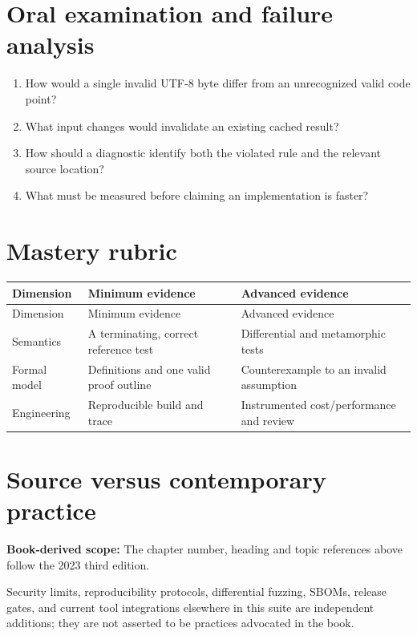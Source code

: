 \documentclass[10pt,letterpaper]{article}
\begin{document}
\section{Oral examination and failure analysis}
\begin{enumerate}
\item How would a single invalid UTF-8 byte differ from an unrecognized valid code point?
\item What input changes would invalidate an existing cached result?
\item How should a diagnostic identify both the violated rule and the relevant source location?
\item What must be measured before claiming an implementation is faster?
\end{enumerate}

\section{Mastery rubric}
\begin{longtable}{|>{\raggedright\arraybackslash}p{}|>{\raggedright\arraybackslash}p{}|>{\raggedright\arraybackslash}p{}|}
\hline
Dimension & Minimum evidence & Advanced evidence\\ \hline\endfirsthead
\hline
Dimension & Minimum evidence & Advanced evidence\\ \hline\endhead
Semantics & A terminating, correct reference test & Differential and metamorphic tests\\ \hline
Formal model & Definitions and one valid proof outline & Counterexample to an invalid assumption\\ \hline
Engineering & Reproducible build and trace & Instrumented cost/performance and review\\ \hline
\end{longtable}

\section{Source versus contemporary practice}
\textbf{Book-derived scope:} The chapter number, heading and topic references above follow the 2023 third edition.\par\modern Security limits, reproducibility protocols, differential fuzzing, SBOMs, release gates, and current tool integrations elsewhere in this suite are independent additions; they are not asserted to be practices advocated in the book.
\end{document}
